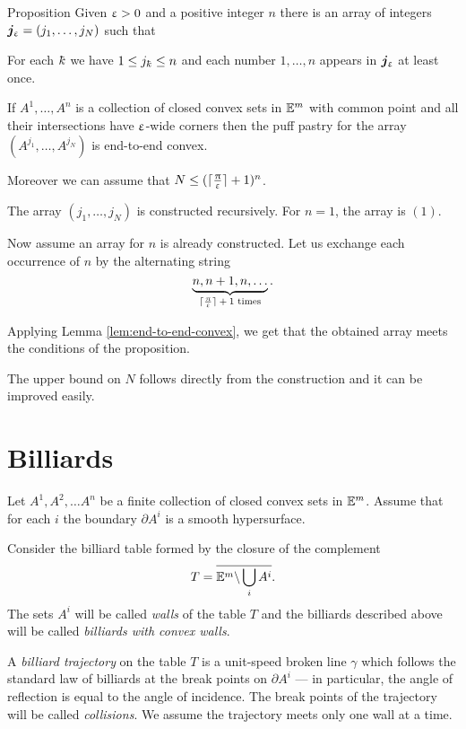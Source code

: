 \begin{thm}{Proposition}\label{prop:end-to-end-convex}
Given $\upvarepsilon>0$ and a positive integer $n$
there is an array of integers $\bm{j}_\eps=(j_1,\dots,j_N)$ 
such that 

\begin{subthm}{} For each $\kay$ we have $1\le j_\kay\le n$
and each number $1,\dots,n$ appears in $\bm{j}_\upvarepsilon$ at least once.
\end{subthm}

\begin{subthm}{}
If $A^1,\dots,A^n$ is a collection of closed convex sets in $\mathbb{E}^m$ with common point 
and all their intersections have $\upvarepsilon$-wide corners 
then the puff pastry for the array
$(A^{j_1},\dots,A^{j_N})$ is end-to-end convex.
\end{subthm}

Moreover we can assume that $N\le (\lceil\tfrac\pi\eps\rceil+1)^n$.
\end{thm}

The array $(j_1,\dots,j_N)$ is constructed recursively.
For $n=1$, the array  is $(1)$.

Now assume an array for $n$ is already constructed.
Let us exchange each occurrence of $n$ by the alternating string 
\[\underbrace{n,n+1,n,\dots}_{\text{$\lceil\tfrac\pi\eps\rceil+1$ times}}.\]

Applying Lemma \ref{lem:end-to-end-convex}, 
we get that the obtained array meets the conditions of the proposition.

The upper bound on $N$ follows directly from the construction
and it can be improved easily.
\qeds



\section{Billiards}

Let $A^1,A^2,\dots A^n$ be a finite collection of closed convex sets in $\mathbb{E}^m$.
Assume that for each $i$
the boundary $\partial A^i$ is a smooth hypersurface.

Consider the billiard table formed by the closure of the complement 
$$T=\overline{\mathbb{E}^m\backslash \bigcup_{i} A^i}.$$
The sets $A^i$ will be called \emph{walls} of the table $T$ 
and the billiards described above will be called \emph{billiards with convex walls}.

A \emph{billiard trajectory} 
on the table $T$ is a unit-speed broken line $\gamma$ 
which follows  the
standard law of billiards 
at the break points on $\partial A^i$ 
--- in particular, the angle of reflection is equal to the angle of incidence.
The break points of the trajectory will be called \emph{collisions}.
We assume the trajectory meets only one wall at a time.

